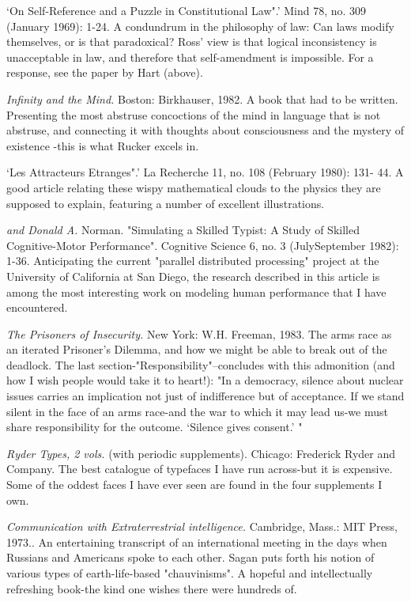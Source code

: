  `On Self-Reference and a Puzzle in Constitutional Law".' Mind 78, no. 309 (January 1969): 1-24. A condundrum in the philosophy of law: Can laws modify themselves, or is that paradoxical? Ross' view is that logical inconsistency is unacceptable in law, and therefore that self-amendment is impossible. For a response, see the paper by Hart (above).

 {\sl Infinity and the Mind.} Boston: Birkhauser, 1982. A book that had to be written. Presenting the most abstruse concoctions of the mind in language that is not abstruse, and connecting it with thoughts about consciousness and the mystery of existence -this is what Rucker excels in.

 `Les Attracteurs Etranges".' La Recherche 11, no. 108 (February 1980): 131- 44. A good article relating these wispy mathematical clouds to the physics they are supposed to explain, featuring a number of excellent illustrations.

 {\sl and Donald A.} Norman. "Simulating a Skilled Typist: A Study of Skilled Cognitive-Motor Performance". Cognitive Science 6, no. 3 (JulySeptember 1982): 1-36. Anticipating the current "parallel distributed processing" project at the University of California at San Diego, the research described in this article is among the most interesting work on modeling human performance that I have encountered.

 {\sl The Prisoners of Insecurity.} New York: W.H. Freeman, 1983. The arms race as an iterated Prisoner's Dilemma, and how we might be able to break out of the deadlock. The last section-"Responsibility"--concludes with this admonition (and how I wish people would take it to heart!): "In a democracy, silence about nuclear issues carries an implication not just of indifference but of acceptance. If we stand silent in the face of an arms race-and the war to which it may lead us-we must share responsibility for the outcome. `Silence gives consent.' "

 {\sl Ryder Types, 2 vols.} (with periodic supplements). Chicago: Frederick Ryder and Company. The best catalogue of typefaces I have run across-but it is expensive. Some of the oddest faces I have ever seen are found in the four supplements I own.

 {\sl Communication with Extraterrestrial intelligence.} Cambridge, Mass.: MIT Press, 1973.. An entertaining transcript of an international meeting in the days when Russians and Americans spoke to each other. Sagan puts forth his notion of various types of earth-life-based "chauvinisms". A hopeful and intellectually refreshing book-the kind one wishes there were hundreds of.

